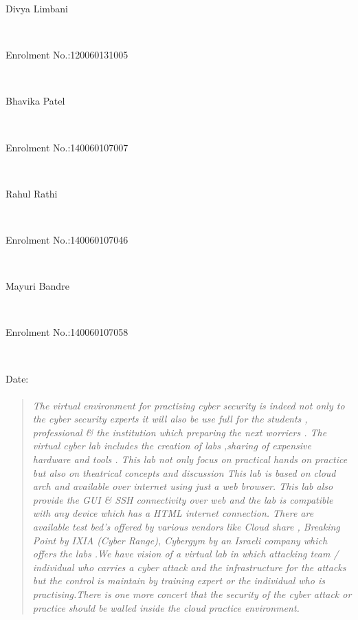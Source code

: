 \documentclass[12pt,a4paper,final,oneside]{report}
\begin{document}
	\begin{flushleft}
		\begin{large}Divya Limbani \end{large}\\
		\begin{large}Enrolment No.:120060131005 \end{large}\\
		\noindent\textbf{}
		
		\begin{large}Bhavika Patel \end{large}\\
		\begin{large}Enrolment No.:140060107007 \end{large}\\
		\noindent\textbf{}
		
		
		\begin{large}Rahul Rathi \end{large}\\
		\begin{large}Enrolment No.:140060107046 \end{large}\\
		\noindent\textbf{}
		
		
		\begin{large}Mayuri Bandre \end{large}\\
		\begin{large}Enrolment No.:140060107058 \end{large}\\
		\noindent\textbf{}
		
		
	\end{flushleft}
	\begin{flushright}
		Date:
	\end{flushright}
\newpage
\begin{abstract}
\paragraph{}
\textit{The virtual environment for practising cyber security is indeed not only to the cyber security experts it will also be use full for the students , professional \&
the institution which preparing the next worriers . The virtual cyber lab includes the creation of labs ,sharing of  expensive hardware and tools . This lab not 
only focus on practical hands on practice but also on theatrical concepts and discussion  This lab is based on cloud arch and available over internet using just a
web browser. This lab also provide the GUI \& SSH connectivity over web and the lab is compatible with any device which has a HTML%
internet connection. There are available test bed's offered by various vendors like Cloud share , Breaking Point by IXIA (Cyber Range), Cybergym by an Israeli company
which offers the labs .We have vision of a virtual lab in which attacking team / individual who carries a cyber attack and the infrastructure for the attacks but the 
control is maintain by training expert or the individual who is practising.There is one more concert that the security of the cyber attack or practice should be 
walled inside the cloud practice environment.} 


\end{abstract}
\end{document}
